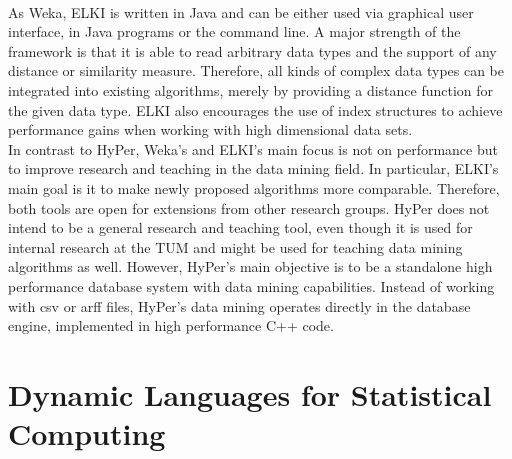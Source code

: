 \\
As Weka, ELKI is written in Java and can be either used via graphical user interface, in Java programs or the command line. A major strength of the framework is that it is able to read arbitrary data types and the support of any distance or similarity measure. Therefore, all kinds of complex data types can be integrated into existing algorithms, merely by providing a distance function for the given data type. ELKI also encourages the use of index structures to achieve performance gains when working with high dimensional data sets. 
\\
In contrast to HyPer, Weka's and ELKI's main focus is not on performance but to improve research and teaching in the data mining field. In particular, ELKI's main goal is it to make newly proposed algorithms more comparable. Therefore, both tools are open for extensions from other research groups. HyPer does not intend to be a general research and teaching tool, even though it is used for internal research at the TUM and might be used for teaching data mining algorithms as well. However, HyPer's main objective is to be a standalone high performance database system with data mining capabilities. Instead of working with csv or arff files, HyPer's data mining operates directly in the database engine, implemented in high performance C++ code. 


\section{Dynamic Languages for Statistical Computing}

